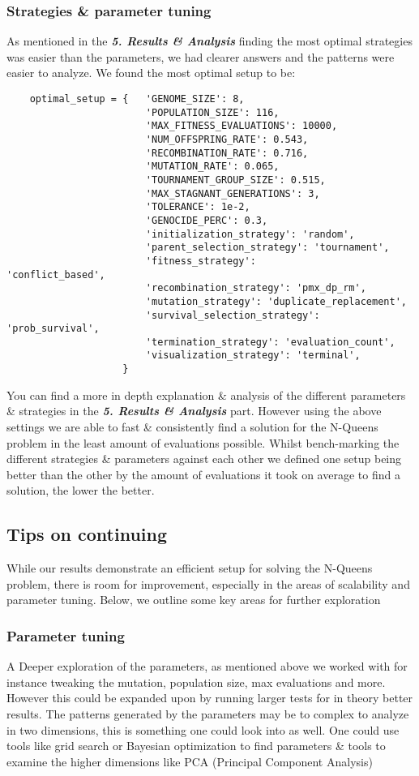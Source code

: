 \subsubsection{Strategies \& parameter tuning}
As mentioned in the \textbf{\textit{5. Results \& Analysis}} finding the most optimal strategies was easier than the parameters, we had clearer answers and the patterns were easier to analyze. We found the most optimal setup to be:
\begin{verbatim}
    optimal_setup = {   'GENOME_SIZE': 8,
                        'POPULATION_SIZE': 116, 
                        'MAX_FITNESS_EVALUATIONS': 10000,
                        'NUM_OFFSPRING_RATE': 0.543, 
                        'RECOMBINATION_RATE': 0.716, 
                        'MUTATION_RATE': 0.065, 
                        'TOURNAMENT_GROUP_SIZE': 0.515, 
                        'MAX_STAGNANT_GENERATIONS': 3,
                        'TOLERANCE': 1e-2,
                        'GENOCIDE_PERC': 0.3,
                        'initialization_strategy': 'random', 
                        'parent_selection_strategy': 'tournament', 
                        'fitness_strategy':           'conflict_based',
                        'recombination_strategy': 'pmx_dp_rm', 
                        'mutation_strategy': 'duplicate_replacement', 
                        'survival_selection_strategy': 'prob_survival',
                        'termination_strategy': 'evaluation_count',
                        'visualization_strategy': 'terminal',
                    }
\end{verbatim}
You can find a more in depth explanation \& analysis of the different parameters \& strategies in the
\textbf{\textit{5. Results \& Analysis}} part. However using the above settings we are able to fast \& consistently find a solution for the N-Queens problem in the least amount of evaluations possible. Whilst bench-marking the different strategies \& parameters against each other we defined one setup being better than the other by the amount of evaluations it took on average to find a solution, the lower the better.
\subsection{Tips on continuing}
While our results demonstrate an efficient setup for solving the N-Queens problem, there is room for improvement, especially in the areas of scalability and parameter tuning. Below, we outline some key areas for further exploration
\subsubsection{Parameter tuning}
A Deeper exploration of the parameters, as mentioned above we worked with for instance tweaking the mutation, population size, max evaluations and more. However this could be expanded upon by running larger tests for in theory better results. The patterns generated by the parameters may be to complex to analyze in two dimensions, this is something one could look into as well. One could use tools like grid search or Bayesian optimization to find parameters \& tools to examine the higher dimensions like PCA (Principal Component Analysis)
